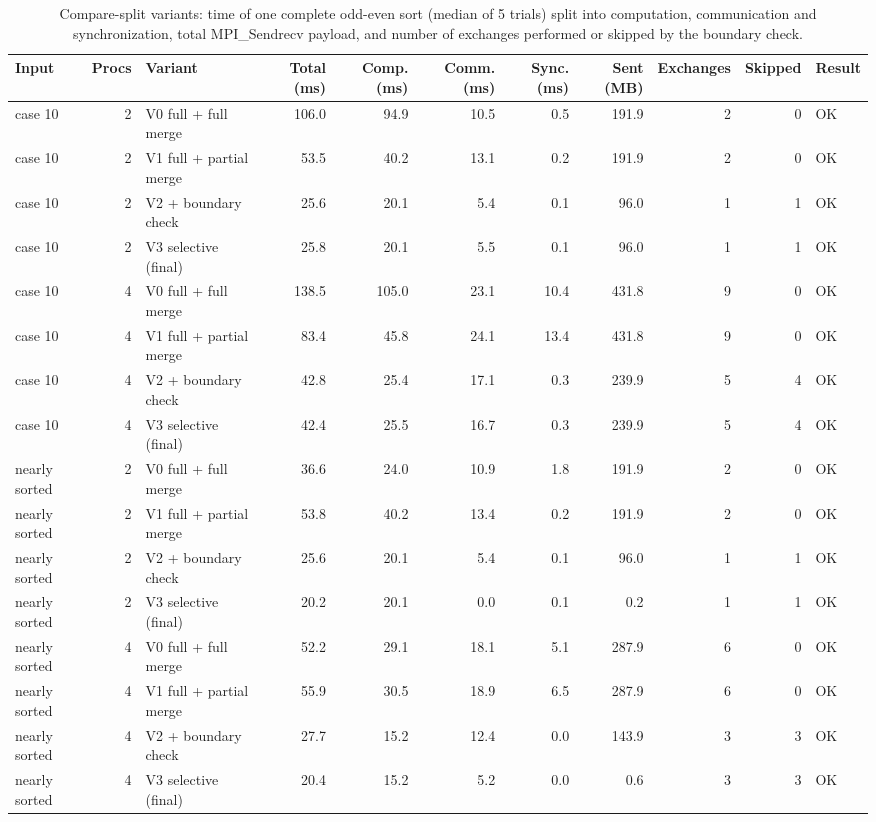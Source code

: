 \begin{table}[htbp]
\centering
\caption{Compare-split variants: time of one complete odd-even sort (median of 5 trials) split into computation, communication and synchronization, total MPI\_Sendrecv payload, and number of exchanges performed or skipped by the boundary check.}
\label{tab:opt-split}
\begin{tabular}{lrlrrrrrrrl}
\toprule
Input & Procs & Variant & Total (ms) & Comp. (ms) & Comm. (ms) & Sync. (ms) & Sent (MB) & Exchanges & Skipped & Result \\
\midrule
case 10 & 2 & V0 full + full merge & 106.0 & 94.9 & 10.5 & 0.5 & 191.9 & 2 & 0 & OK \\
case 10 & 2 & V1 full + partial merge & 53.5 & 40.2 & 13.1 & 0.2 & 191.9 & 2 & 0 & OK \\
case 10 & 2 & V2 + boundary check & 25.6 & 20.1 & 5.4 & 0.1 & 96.0 & 1 & 1 & OK \\
case 10 & 2 & V3 selective (final) & 25.8 & 20.1 & 5.5 & 0.1 & 96.0 & 1 & 1 & OK \\
case 10 & 4 & V0 full + full merge & 138.5 & 105.0 & 23.1 & 10.4 & 431.8 & 9 & 0 & OK \\
case 10 & 4 & V1 full + partial merge & 83.4 & 45.8 & 24.1 & 13.4 & 431.8 & 9 & 0 & OK \\
case 10 & 4 & V2 + boundary check & 42.8 & 25.4 & 17.1 & 0.3 & 239.9 & 5 & 4 & OK \\
case 10 & 4 & V3 selective (final) & 42.4 & 25.5 & 16.7 & 0.3 & 239.9 & 5 & 4 & OK \\
nearly sorted & 2 & V0 full + full merge & 36.6 & 24.0 & 10.9 & 1.8 & 191.9 & 2 & 0 & OK \\
nearly sorted & 2 & V1 full + partial merge & 53.8 & 40.2 & 13.4 & 0.2 & 191.9 & 2 & 0 & OK \\
nearly sorted & 2 & V2 + boundary check & 25.6 & 20.1 & 5.4 & 0.1 & 96.0 & 1 & 1 & OK \\
nearly sorted & 2 & V3 selective (final) & 20.2 & 20.1 & 0.0 & 0.1 & 0.2 & 1 & 1 & OK \\
nearly sorted & 4 & V0 full + full merge & 52.2 & 29.1 & 18.1 & 5.1 & 287.9 & 6 & 0 & OK \\
nearly sorted & 4 & V1 full + partial merge & 55.9 & 30.5 & 18.9 & 6.5 & 287.9 & 6 & 0 & OK \\
nearly sorted & 4 & V2 + boundary check & 27.7 & 15.2 & 12.4 & 0.0 & 143.9 & 3 & 3 & OK \\
nearly sorted & 4 & V3 selective (final) & 20.4 & 15.2 & 5.2 & 0.0 & 0.6 & 3 & 3 & OK \\
\bottomrule
\end{tabular}
\end{table}

